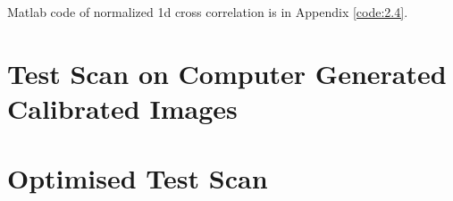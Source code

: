 Matlab code of normalized 1d cross correlation is in Appendix \ref{code:2.4}.

\section{Test Scan on Computer Generated Calibrated Images}

\section{Optimised Test Scan}